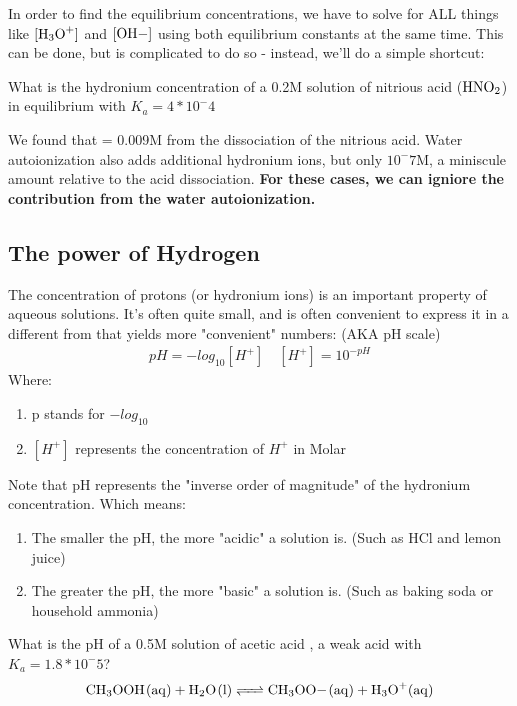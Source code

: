\documentclass[../CHEM152Notes.tex]{subfiles}
\begin{document}
In order to find the equilibrium concentrations, we have to solve for ALL things like $\ce{[H3O+]}$ and $\ce{[OH-]}$ using both equilibrium constants at the same time. 
\newline
This can be done, but is complicated to do so - instead, we'll do a simple shortcut:

\begin{exmp}
    What is the hydronium concentration of a 0.2M solution of nitrious acid ($\ce{HNO2}$) in equilibrium with $K_a = 4*10^-4$
\end{exmp}
We found that \ce{[H3O+]} = 0.009M from the dissociation of the nitrious acid. Water autoionization also adds additional hydronium ions, but only $10^-7$M, a miniscule amount relative to the acid dissociation.
\newline
\textbf{For these cases, we can igniore the contribution from the water autoionization.}

\subsection*{The power of Hydrogen}
The concentration of protons (or hydronium ions) is an important property of aqueous solutions. It's often quite small, and is often convenient to express it in a different from that yields more "convenient" numbers: (AKA pH scale)
\begin{equation*}
    \begin{aligned}
        pH = -log_{10}[H^+] \quad [H^+] = 10^{-pH}
    \end{aligned}
\end{equation*}
Where:
\begin{enumerate}
    \item p stands for $-log_{10}$
    \item $[H^+]$ represents the concentration of $H^+$ in Molar
\end{enumerate}
Note that pH represents the "inverse order of magnitude" of the hydronium concentration. Which means:
\begin{enumerate}
    \item The smaller the pH, the more "acidic" a solution is. (Such as HCl and lemon juice)
    \item The greater the pH, the more "basic" a solution is. (Such as baking soda or household ammonia)
\end{enumerate}

\begin{exmp}
    What is the pH of a 0.5M solution of acetic acid , a weak acid with $K_a = 1.8*10^-5$?
    \begin{equation*}
        \begin{aligned}
            \ce{CH3OOH_(aq) + H2O_(l) <=> CH3OO-_(aq) + H3O+_(aq)}
        \end{aligned}
    \end{equation*}
\end{exmp}
\end{document}

